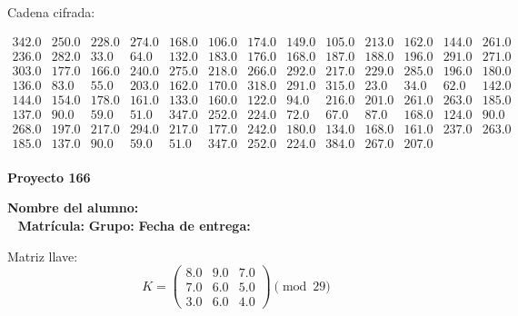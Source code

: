 \documentclass[12pt]{article}
\begin{document}
Cadena cifrada:
\begin{center}
$\begin{array}{lllllllllllll}
342.0 & 250.0 & 228.0 & 274.0 & 168.0 & 106.0 & 174.0 & 149.0 & 105.0 & 213.0 & 162.0 & 144.0 & 261.0\\
236.0 & 282.0 & 33.0 & 64.0 & 132.0 & 183.0 & 176.0 & 168.0 & 187.0 & 188.0 & 196.0 & 291.0 & 271.0\\
303.0 & 177.0 & 166.0 & 240.0 & 275.0 & 218.0 & 266.0 & 292.0 & 217.0 & 229.0 & 285.0 & 196.0 & 180.0\\
136.0 & 83.0 & 55.0 & 203.0 & 162.0 & 170.0 & 318.0 & 291.0 & 315.0 & 23.0 & 34.0 & 62.0 & 142.0\\
144.0 & 154.0 & 178.0 & 161.0 & 133.0 & 160.0 & 122.0 & 94.0 & 216.0 & 201.0 & 261.0 & 263.0 & 185.0\\
137.0 & 90.0 & 59.0 & 51.0 & 347.0 & 252.0 & 224.0 & 72.0 & 67.0 & 87.0 & 168.0 & 124.0 & 90.0\\
268.0 & 197.0 & 217.0 & 294.0 & 217.0 & 177.0 & 242.0 & 180.0 & 134.0 & 168.0 & 161.0 & 237.0 & 263.0\\
185.0 & 137.0 & 90.0 & 59.0 & 51.0 & 347.0 & 252.0 & 224.0 & 384.0 & 267.0 & 207.0\\
\end{array}$
\end{center}

\newpage


\textbf{Proyecto 166}

\textbf{Nombre del alumno:} \underline{\hspace{13cm}}\\\
\vspace{1cm}
\textbf{Matrícula:} \underline{\hspace{4cm}} \hspace{1cm}
\textbf{Grupo:} \underline{\hspace{2cm}}
\textbf{Fecha de entrega:} \underline{\hspace{2cm}}

\medskip

Matriz llave:
\[
K = \begin{pmatrix}
8.0 & 9.0 & 7.0\\
7.0 & 6.0 & 5.0\\
3.0 & 6.0 & 4.0
\end{pmatrix} \pmod{29}
\]
\end{document}
